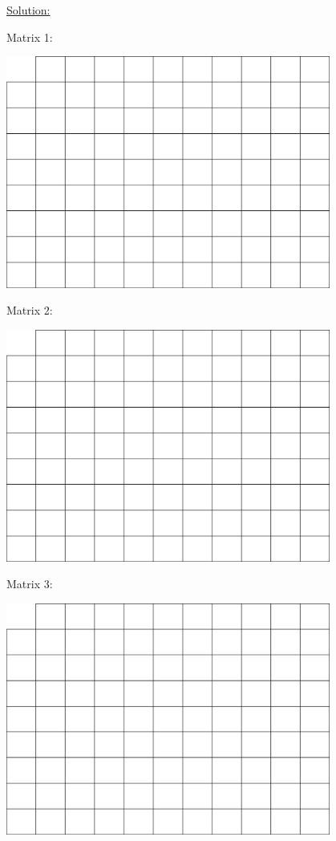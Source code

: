 \documentclass[a4paper,11pt]{article}
\begin{document}
\underline{Solution:}
\newpage

Matrix 1:
\begin{center}
\includegraphics[width=0.8\textwidth]{matrix.png}
\end{center}
\vspace{1.5cm}

Matrix 2:
\begin{center}
\includegraphics[width=0.8\textwidth]{matrix.png}
\end{center}
\vspace{1.5cm}

\newpage 

Matrix 3: 
\begin{center}
\includegraphics[width=0.8\textwidth]{matrix.png}
\end{center}
\vspace{0.5cm}
\end{document}
